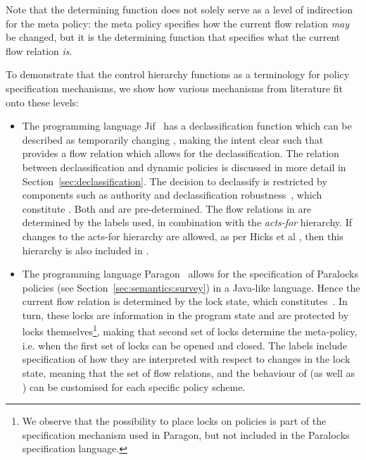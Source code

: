 Note that the determining function does not solely serve as a level of indirection for the meta policy:
the meta policy specifies how the current flow relation \emph{may} be changed, but it is the determining function that specifies what the current flow relation \emph{is}.


To demonstrate that the control hierarchy functions as a terminology for policy specification mechanisms, 
we show how various mechanisms from literature fit onto these levels:
\begin{itemize}

  \item The programming language Jif~\cite{Myers:POPL99} has a declassification function which can be
        described as temporarily changing , making the intent clear such that \dynamicpol{} provides
        a flow relation which allows for the declassification.
        The relation between declassification and dynamic policies is discussed in more detail in 
        Section~\ref{sec:declassification}.
        The decision to declassify is restricted by components such as authority and declassification
        robustness~\cite{Zdancewic:Myers:CSFW01}, which constitute . Both \dynamicpol{} and \metapol{}
        are pre-determined.
        The flow relations in \orderings{} are determined by the labels used, in combination with the
        \emph{acts-for} hierarchy. If changes to the acts-for hierarchy are allowed, 
        as per Hicks et al \cite{Hicks+:Dynamic}, then this hierarchy is also included in .

  \item The programming language Paragon~\cite{Paragon} allows for the specification of Paralocks policies (see Section~\ref{sec:semantics:survey}) in a Java-like language.
        Hence the current flow relation is determined by the lock state, 
        which constitutes~. In turn, these locks are information in the program state and are protected by
        locks themselves\footnote{We observe that the possibility to place locks on policies is part of the 
        specification mechanism used in Paragon, but not included in the Paralocks specification language.}, 
        making that second set of locks determine the meta-policy, i.e. when the first set of locks can be 
        opened and closed. The labels include specification of how they are interpreted with respect to
        changes in the lock state, meaning that the set of flow relations, and the behaviour of \dynamicpol{}
        (as well as \metapol{}) can be customised for each specific policy scheme.


\end{itemize}
